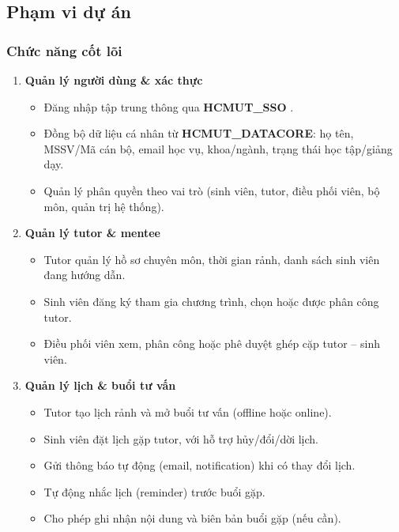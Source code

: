 \subsection{Phạm vi dự án}

\subsubsection{Chức năng cốt lõi}

\begin{enumerate}
    \item \textbf{Quản lý người dùng \& xác thực}
    \begin{itemize}
        \item Đăng nhập tập trung thông qua \textbf{HCMUT\_SSO }.
        \item Đồng bộ dữ liệu cá nhân từ \textbf{HCMUT\_DATACORE}: họ tên, MSSV/Mã cán bộ, email học vụ, khoa/ngành, trạng thái học tập/giảng dạy.
        \item Quản lý phân quyền theo vai trò (sinh viên, tutor, điều phối viên, bộ môn, quản trị hệ thống).
    \end{itemize}

    \item \textbf{Quản lý tutor \& mentee}
    \begin{itemize}
        \item Tutor quản lý hồ sơ chuyên môn, thời gian rảnh, danh sách sinh viên đang hướng dẫn.
        \item Sinh viên đăng ký tham gia chương trình, chọn hoặc được phân công tutor.
        \item Điều phối viên xem, phân công hoặc phê duyệt ghép cặp tutor -- sinh viên.
    \end{itemize}

    \item \textbf{Quản lý lịch \& buổi tư vấn}
    \begin{itemize}
        \item Tutor tạo lịch rảnh và mở buổi tư vấn (offline hoặc online).
        \item Sinh viên đặt lịch gặp tutor, với hỗ trợ hủy/đổi/dời lịch.
        \item Gửi thông báo tự động (email, notification) khi có thay đổi lịch.
        \item Tự động nhắc lịch (reminder) trước buổi gặp.
        \item Cho phép ghi nhận nội dung và biên bản buổi gặp (nếu cần).
    \end{itemize}


\end{enumerate}
